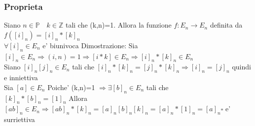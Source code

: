 \documentclass{article}
\begin{document}
     \subsubsection{Proprieta}
     \begin{flushleft}
       Siano $n \in \mathbb{P} \quad k \in \mathbb{Z}$ tali che (k,n)=1. Allora la funzione $f:E_n \to E_n$ definita da $f([i]_n)=[i]_n*[k]_n$ \\ 
       $\forall [i]_n \in E_n$ e' biunivoca
       Dimostrazione: Sia $[i]_n \in E_n \Rightarrow (i,n)=1 \Rightarrow [i*k]\in E_n \Rightarrow [i]_n*[k]_n \in E_n$ \\ 
       Siano $[i]_n[j]_n \in E_n $ tali che $ [i]_n*[k]_n=[j]_n*[k]_n \Rightarrow [i]_n = [j]_n$ quindi e inniettiva \\ 
       Sia $[a] \in E_n$ Poiche' (k,n)=1 $\Rightarrow \exists [b]_n \in E_n$ tali che \\ 
       $[k]_n*[b]_n =[1]_n$ Allora $[ab]_n \in E_n \Rightarrow [ab]_n*[k]_n=[a]_n[b]_n[k]_n= [a]_n*[1]_n=[a]_n \square $ e' surriettiva
     \end{flushleft}
\end{document}
